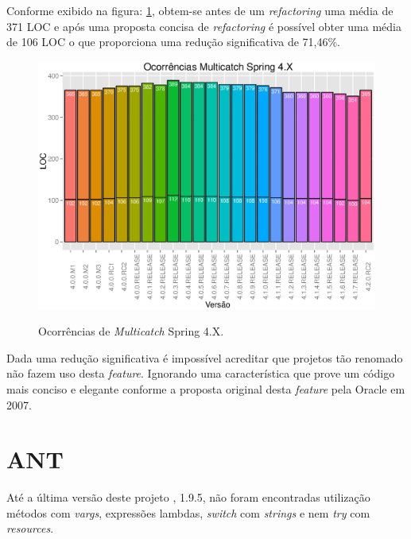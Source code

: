 Conforme exibido na figura: \ref{fig:ocorrenciasMulticatchSpring}, obtem-se antes de um \textit{refactoring} uma média de 371 LOC e após uma proposta concisa de \textit{refactoring} é possível obter uma média de 106 LOC o que proporciona uma redução significativa de 71,46\%.\\


\begin{figure}[h]
	\center
	\includegraphics[width=1.0\textwidth]{Imagens/ocorrenciasMulticatchSpring}
	\label{fig:ocorrenciasMulticatchSpring}
	\caption{Ocorrências de \textit{Multicatch} Spring 4.X.}
\end{figure}


Dada uma redução significativa é impossível acreditar que projetos tão renomado não fazem uso desta \textit{feature}.  Ignorando uma característica que prove um código mais conciso e elegante conforme a proposta original desta \textit{feature} pela Oracle em 2007.\\


\section{ANT}
Até a última versão deste projeto \cite{apacheAnt}, 1.9.5, não foram encontradas utilização métodos com \textit{vargs}, expressões lambdas, \textit{switch} com \textit{strings} e nem \textit{try} com \textit{resources}.\\

